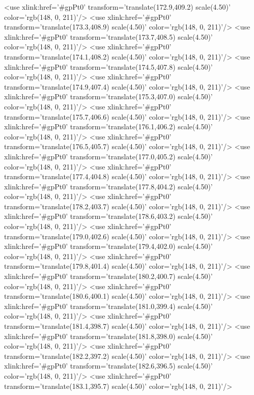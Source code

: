 	<use xlink:href='#gpPt0' transform='translate(172.9,409.2) scale(4.50)' color='rgb(148,   0, 211)'/>
	<use xlink:href='#gpPt0' transform='translate(173.3,408.9) scale(4.50)' color='rgb(148,   0, 211)'/>
	<use xlink:href='#gpPt0' transform='translate(173.7,408.5) scale(4.50)' color='rgb(148,   0, 211)'/>
	<use xlink:href='#gpPt0' transform='translate(174.1,408.2) scale(4.50)' color='rgb(148,   0, 211)'/>
	<use xlink:href='#gpPt0' transform='translate(174.5,407.8) scale(4.50)' color='rgb(148,   0, 211)'/>
	<use xlink:href='#gpPt0' transform='translate(174.9,407.4) scale(4.50)' color='rgb(148,   0, 211)'/>
	<use xlink:href='#gpPt0' transform='translate(175.3,407.0) scale(4.50)' color='rgb(148,   0, 211)'/>
	<use xlink:href='#gpPt0' transform='translate(175.7,406.6) scale(4.50)' color='rgb(148,   0, 211)'/>
	<use xlink:href='#gpPt0' transform='translate(176.1,406.2) scale(4.50)' color='rgb(148,   0, 211)'/>
	<use xlink:href='#gpPt0' transform='translate(176.5,405.7) scale(4.50)' color='rgb(148,   0, 211)'/>
	<use xlink:href='#gpPt0' transform='translate(177.0,405.2) scale(4.50)' color='rgb(148,   0, 211)'/>
	<use xlink:href='#gpPt0' transform='translate(177.4,404.8) scale(4.50)' color='rgb(148,   0, 211)'/>
	<use xlink:href='#gpPt0' transform='translate(177.8,404.2) scale(4.50)' color='rgb(148,   0, 211)'/>
	<use xlink:href='#gpPt0' transform='translate(178.2,403.7) scale(4.50)' color='rgb(148,   0, 211)'/>
	<use xlink:href='#gpPt0' transform='translate(178.6,403.2) scale(4.50)' color='rgb(148,   0, 211)'/>
	<use xlink:href='#gpPt0' transform='translate(179.0,402.6) scale(4.50)' color='rgb(148,   0, 211)'/>
	<use xlink:href='#gpPt0' transform='translate(179.4,402.0) scale(4.50)' color='rgb(148,   0, 211)'/>
	<use xlink:href='#gpPt0' transform='translate(179.8,401.4) scale(4.50)' color='rgb(148,   0, 211)'/>
	<use xlink:href='#gpPt0' transform='translate(180.2,400.7) scale(4.50)' color='rgb(148,   0, 211)'/>
	<use xlink:href='#gpPt0' transform='translate(180.6,400.1) scale(4.50)' color='rgb(148,   0, 211)'/>
	<use xlink:href='#gpPt0' transform='translate(181.0,399.4) scale(4.50)' color='rgb(148,   0, 211)'/>
	<use xlink:href='#gpPt0' transform='translate(181.4,398.7) scale(4.50)' color='rgb(148,   0, 211)'/>
	<use xlink:href='#gpPt0' transform='translate(181.8,398.0) scale(4.50)' color='rgb(148,   0, 211)'/>
	<use xlink:href='#gpPt0' transform='translate(182.2,397.2) scale(4.50)' color='rgb(148,   0, 211)'/>
	<use xlink:href='#gpPt0' transform='translate(182.6,396.5) scale(4.50)' color='rgb(148,   0, 211)'/>
	<use xlink:href='#gpPt0' transform='translate(183.1,395.7) scale(4.50)' color='rgb(148,   0, 211)'/>
